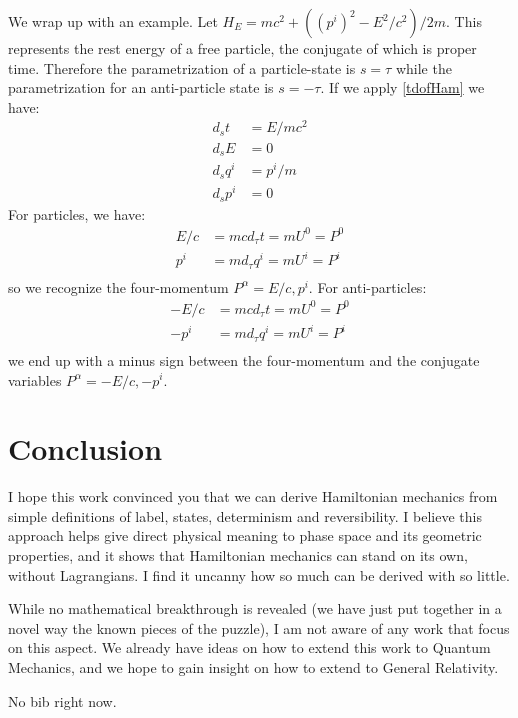 \documentclass[twocolumn,floatfix,nofootinbib]{revtex4}   %
\theoremstyle{theorem}
\theoremstyle{definition}
\begin{document}
We wrap up with an example. Let $H_{E}= mc^2 + ((p^i)^2 - E^2/c^2) / 2m$. This represents the rest energy of a free particle, the conjugate of which is proper time. Therefore the parametrization of a particle-state is $s=\tau$ while the parametrization for an anti-particle state is $s=-\tau$. If we apply \ref{tdofHam} we have:
\begin{align*}
d_{s}t &= E / mc^2 \\
d_{s}E &= 0 \\
d_{s}q^i &= p^i / m \\
d_{s}p^i &= 0
\end{align*}
For particles, we have:
\begin{align*}
E / c &= m c d_{\tau}t = m U^0 = P^0 \\
p^i &= m d_{\tau}q^i = m U^i = P^i \\
\end{align*}
so we recognize the four-momentum $P^\alpha = {E/c, p^i}$. For anti-particles:
\begin{align*}
- E / c &= m c d_{\tau}t = m U^0 = P^0 \\
- p^i &= m d_{\tau}q^i = m U^i = P^i \\
\end{align*}
we end up with a minus sign between the four-momentum and the conjugate variables $P^\alpha = {-E/c, -p^i}$. 

\section{Conclusion}
I hope this work convinced you that we can derive Hamiltonian mechanics from simple definitions of label, states, determinism and reversibility. I believe this approach helps give direct physical meaning to phase space and its geometric properties, and it shows that Hamiltonian mechanics can stand on its own, without Lagrangians. I find it uncanny how so much can be derived with so little.

While no mathematical breakthrough is revealed (we have just put together in a novel way the known pieces of the puzzle), I am not aware of any work that focus on this aspect. We already have ideas on how to extend this work to Quantum Mechanics, and we hope to gain insight on how to extend to General Relativity.

\begin{thebibliography}{5}

 No bib right now.

\end{thebibliography}
\end{document}
